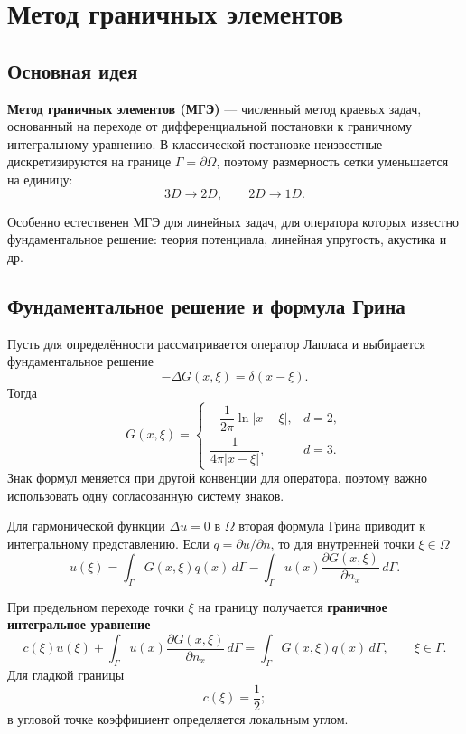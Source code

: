\section{Метод граничных элементов}
\label{sec:boundary-element-method}

\subsection{Основная идея}

\textbf{Метод граничных элементов (МГЭ)} --- численный метод краевых задач, основанный на переходе от дифференциальной постановки к граничному интегральному уравнению. В классической постановке неизвестные дискретизируются на границе $\Gamma=\partial\Omega$, поэтому размерность сетки уменьшается на единицу:
\[
3D\rightarrow2D,
\qquad
2D\rightarrow1D.
\]

Особенно естественен МГЭ для линейных задач, для оператора которых известно фундаментальное решение: теория потенциала, линейная упругость, акустика и др.

\subsection{Фундаментальное решение и формула Грина}

Пусть для определённости рассматривается оператор Лапласа и выбирается фундаментальное решение
\[
-\Delta G(x,\xi)=\delta(x-\xi).
\]
Тогда
\[
G(x,\xi)=
\begin{cases}
-\dfrac{1}{2\pi}\ln|x-\xi|,& d=2,\\[2mm]
\dfrac{1}{4\pi|x-\xi|},& d=3.
\end{cases}
\]
Знак формул меняется при другой конвенции для оператора, поэтому важно использовать одну согласованную систему знаков.

Для гармонической функции $\Delta u=0$ в $\Omega$ вторая формула Грина приводит к интегральному представлению. Если $q=\partial u/\partial n$, то для внутренней точки $\xi\in\Omega$
\[
\boxed{
u(\xi)=
\int_\Gamma G(x,\xi)q(x)\,d\Gamma
-
\int_\Gamma u(x)\frac{\partial G(x,\xi)}{\partial n_x}\,d\Gamma.}
\]

При предельном переходе точки $\xi$ на границу получается \textbf{граничное интегральное уравнение}
\[
\boxed{
c(\xi)u(\xi)
+
\int_\Gamma u(x)\frac{\partial G(x,\xi)}{\partial n_x}\,d\Gamma
=
\int_\Gamma G(x,\xi)q(x)\,d\Gamma,
\qquad \xi\in\Gamma.}
\]
Для гладкой границы
\[
c(\xi)=\frac12;
\]
в угловой точке коэффициент определяется локальным углом.


